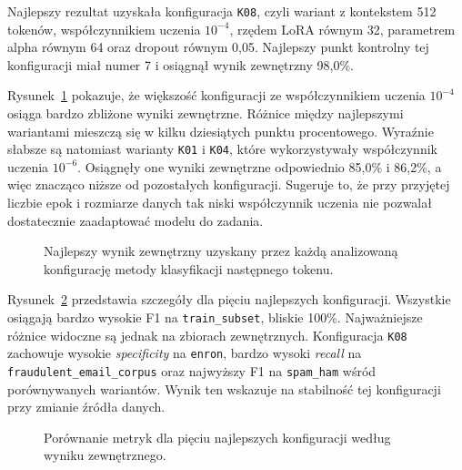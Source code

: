 Najlepszy rezultat uzyskała konfiguracja \texttt{K08}, czyli wariant z
kontekstem 512 tokenów, współczynnikiem uczenia \(10^{-4}\), rzędem LoRA równym
32, parametrem alpha równym 64 oraz dropout równym 0,05. Najlepszy punkt
kontrolny tej konfiguracji miał numer 7 i osiągnął wynik zewnętrzny
98,0\%.

\begin{table}[htbp]
\centering
\small
\resizebox{\textwidth}{!}{}
\caption{Ranking najlepszych punktów kontrolnych dla konfiguracji metody
klasyfikacji następnego tokenu. Wynik zewnętrzny jest średnią z \emph{specificity} na
\texttt{enron}, \emph{recall} na \texttt{fraudulent\_email\_corpus} oraz F1 na
\texttt{spam\_ham}.}
\label{tab:checkpoint-config-ranking}
\end{table}

Rysunek~\ref{fig:checkpoint-external-score-ranking} pokazuje, że większość
konfiguracji ze współczynnikiem uczenia \(10^{-4}\) osiąga bardzo zbliżone wyniki
zewnętrzne. Różnice między najlepszymi wariantami mieszczą się w kilku
dziesiątych punktu procentowego. Wyraźnie słabsze są natomiast warianty
\texttt{K01} i \texttt{K04}, które wykorzystywały współczynnik uczenia \(10^{-6}\).
Osiągnęły one wyniki zewnętrzne odpowiednio 85,0\% i 86,2\%, a więc znacząco
niższe od pozostałych konfiguracji. Sugeruje to, że przy przyjętej liczbie epok
i rozmiarze danych tak niski współczynnik uczenia nie pozwalał dostatecznie
zaadaptować modelu do zadania.

\begin{figure}[htbp]
\centering

\caption{Najlepszy wynik zewnętrzny uzyskany przez każdą analizowaną konfigurację
metody klasyfikacji następnego tokenu.}
\label{fig:checkpoint-external-score-ranking}
\end{figure}

Rysunek~\ref{fig:checkpoint-top-config-dataset-metrics} przedstawia szczegóły
dla pięciu najlepszych konfiguracji. Wszystkie osiągają bardzo wysokie F1 na
\texttt{train\_subset}, bliskie 100\%. Najważniejsze różnice widoczne są
jednak na zbiorach zewnętrznych. Konfiguracja \texttt{K08} zachowuje wysokie
\emph{specificity} na \texttt{enron}, bardzo wysoki \emph{recall} na
\texttt{fraudulent\_email\_corpus} oraz najwyższy F1 na \texttt{spam\_ham}
wśród porównywanych wariantów. Wynik ten wskazuje na stabilność tej konfiguracji
przy zmianie źródła danych.

\begin{figure}[htbp]
\centering

\caption{Porównanie metryk dla pięciu najlepszych konfiguracji według wyniku
zewnętrznego.}
\label{fig:checkpoint-top-config-dataset-metrics}
\end{figure}


